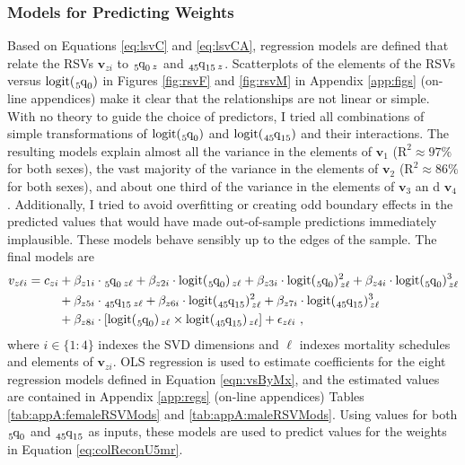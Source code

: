 \documentclass[11pt]{article}
\newcommand{\mbf}{\mathbf}
\newcommand{\qf}{\tensor*[_5]{\mbox{q}}{_0}}
\newcommand{\qff}{\tensor*[_{45}]{\mbox{q}}{_{15}}}
\newcommand{\logit}{\mbox{logit}}
\begin{document}
\subsubsection{Models for Predicting Weights} \label{sec:modsPredWeights}

Based on Equations \ref{eq:lsvC} and \ref{eq:lsvCA}, regression models are defined that relate the RSVs $\mbf{v}_{zi}$ to $\qf_{\, z}$ and $\qff_{\, z}$.  Scatterplots of the elements of the RSVs versus $\logit(\qf)$ in Figures \ref{fig:rsvF} and \ref{fig:rsvM} in Appendix \ref{app:figs} (on-line appendices) make it clear that the relationships are not linear or simple.  With no theory to guide the choice of predictors, I tried all combinations of simple transformations of $\logit(\qf)$ and $\logit(\qff)$ and their interactions.  The resulting models explain almost all the variance in the elements of $\mbf{v}_1$ ($\mbox{R}^2 \approx 97\%$ for both sexes), the vast majority of the variance in the elements of $\mbf{v}_2$ ($\mbox{R}^2 \approx 86\%$ for both sexes), and about one third of the variance in the elements of $\mbf{v}_3$ an d $\mbf{v}_4$.  Additionally, I tried to avoid overfitting or creating odd boundary effects in the predicted values that would have made out-of-sample predictions immediately implausible.  These models behave sensibly up to the edges of the sample. The final models are %
%
\begin{align}
v_{z \ell i} = c_{zi} &+  \beta_{z1i} \cdot \qf_{\, z\ell} + \beta_{z2i} \cdot \logit(\qf)_{\, z\ell} + \beta_{z3i} \cdot \logit(\qf)^2_{\, z\ell} + \beta_{z4i} \cdot \logit(\qf)^3_{\, z\ell} \nonumber \\  
 &+ \beta_{z5i} \cdot \qff_{\, z\ell} + \beta_{z6i} \cdot \logit(\qff)^2_{\, z\ell} +  \beta_{z7i} \cdot \logit(\qff)^3_{\, z\ell} \nonumber \\ 
 &+ \beta_{z8i} \cdot [\logit(\qf)_{\, z\ell} \times \logit(\qff)_{\, z\ell}] + \epsilon_{z\ell i} \ , \label{eqn:vsByMx} 
\end{align}%
%
where $i \in \{1:4\}$ indexes the SVD dimensions and $\ell$ indexes mortality schedules and elements of $\mbf{v}_{zi}$.  OLS regression is used to estimate coefficients for the eight regression models defined in Equation \ref{eqn:vsByMx}, and the estimated values are contained in Appendix \ref{app:regs} (on-line appendices) Tables \ref{tab:appA:femaleRSVMods} and \ref{tab:appA:maleRSVMods}.  Using  values for both $\qf$ and $\qff$ as inputs, these models are used to predict values for the weights in Equation \ref{eq:colReconU5mr}.  
\end{document}
